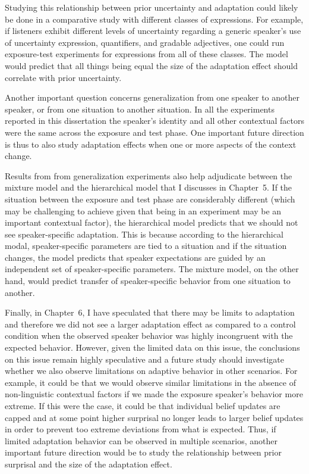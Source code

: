 Studying this relationship between prior uncertainty and adaptation could likely be done in a comparative study with different classes of expressions. For example, if listeners exhibit different levels of uncertainty regarding a generic speaker's use of uncertainty expression, quantifiers, and gradable adjectives, one could run exposure-test experiments for expressions from all of these classes. The model would predict that all things being equal the size of the adaptation effect should correlate with prior uncertainty.

Another important question concerns generalization from one speaker to another speaker, or from one situation to another situation. In all the experiments reported in this dissertation the speaker's identity and all other contextual factors were the same across the exposure and test phase. One important future direction is thus to also study adaptation effects when one or more aspects of the context change. 

Results from from generalization experiments also help adjudicate between the mixture model and the hierarchical model that I discusses in Chapter~5. If the situation between the exposure and test phase are considerably different (which may be challenging to achieve given that being in an experiment may be an important contextual factor), the hierarchical model predicts that we should not see speaker-specific adaptation. This is because according to the hierarchical modal, speaker-specific parameters are tied to a situation and if the situation changes, the model predicts that speaker expectations are guided by an independent set of speaker-specific parameters. The mixture model, on the other hand, would predict transfer of speaker-specific behavior from one situation to another.

Finally, in Chapter~6, I have speculated that there may be limits to adaptation and therefore we did not see a larger adaptation effect as compared to a control condition when the observed speaker behavior was highly incongruent with the expected behavior. However, given the limited data on this issue, the conclusions on this issue remain highly speculative and a future study should investigate whether we also observe limitations on adaptive behavior in other scenarios. For example, it could be that we would observe similar limitations in the absence of non-linguistic contextual factors if we made the exposure speaker's behavior more extreme. If this were the case, it could be that individual belief updates are capped and at some point higher surprisal no longer leads to larger belief updates in order to prevent too extreme deviations from what is expected. Thus, if limited adaptation behavior can be observed in multiple scenarios, another important future direction would be to study the relationship between prior surprisal and the size of the adaptation effect.

